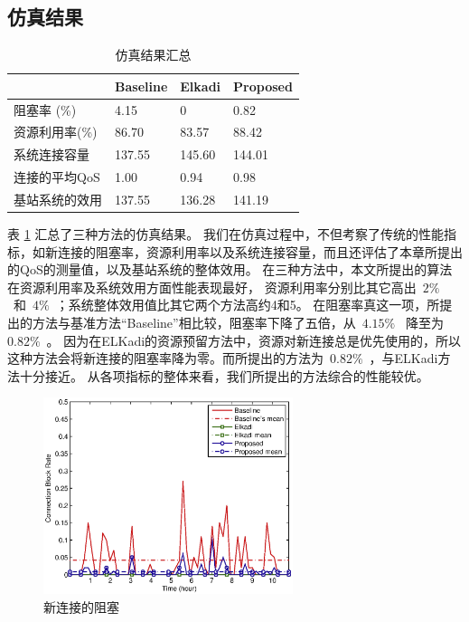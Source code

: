 \subsection{仿真结果}
%
\begin{table}[htbp]
\caption{仿真结果汇总} \label{tb:chap_cacop:res_sim}
\begin{center}
\wuhao
\begin{tabularx}{0.99\textwidth}{XXXX}
\toprule
&Baseline &Elkadi &Proposed\\
\midrule
阻塞率 (\%) &4.15 & 0 &0.82\\
资源利用率(\%) &86.70 &83.57 &88.42\\
系统连接容量 &137.55 &145.60 &144.01\\
连接的平均QoS &1.00 &0.94 &0.98\\
基站系统的效用 &137.55 &136.28 &141.19\\
\bottomrule
\end{tabularx}
\end{center}
\end{table}
表 \ref{tb:chap_cacop:res_sim} 汇总了三种方法的仿真结果。
我们在仿真过程中，不但考察了传统的性能指标，如新连接的阻塞率，资源利用率以及系统连接容量，而且还评估了本章所提出的QoS的测量值，以及基站系统的整体效用。
在三种方法中，本文所提出的算法在资源利用率及系统效用方面性能表现最好，
资源利用率分别比其它高出~$2\%$~和~$4\%$~；系统整体效用值比其它两个方法高约4和5。
在阻塞率真这一项，所提出的方法与基准方法“Baseline”相比较，阻塞率下降了五倍，从~$4.15\%$~ 降至为 ~$0.82\%$~。
因为在ELKadi的资源预留方法中，资源对新连接总是优先使用的，所以这种方法会将新连接的阻塞率降为零。而所提出的方法为~$0.82\%$~，与ELKadi方法十分接近。
从各项指标的整体来看，我们所提出的方法综合的性能较优。
%
\begin{figure}[htbp]
\centering
\includegraphics[width=0.65\textwidth] {cacop_block_rate.eps}
\caption{新连接的阻塞} \label{fig:chap_cacop:clock_accept_block_drop}
\end{figure}

